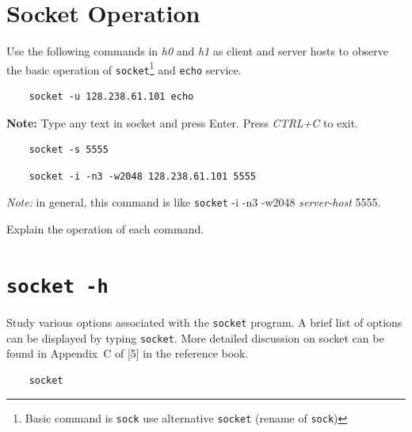\documentclass{UTNetLab}
\begin{document}
\section{Socket Operation}
    Use the following commands in \textit{h0} and \textit{h1} as client and server hosts to observe the basic operation of \lstinline{socket}\footnote{Basic command is \lstinline{sock} use alternative \lstinline{socket} (rename of \lstinline{sock})} and \lstinline{echo} service.
    
    \begin{lstlisting}
    socket -u 128.238.61.101 echo
    \end{lstlisting}
    
   \textbf{Note:} Type any text in socket and press Enter. Press \textit{CTRL+C} to exit.
   
   
    
    \begin{lstlisting}
   	socket -s 5555 
    \end{lstlisting}
    
    \begin{lstlisting}    	
    socket -i -n3 -w2048 128.238.61.101 5555
    \end{lstlisting}
    
    \textit{Note: }in general, this command is like \lstinline{socket} -i -n3 -w2048 \textit{server-host} 5555. 
     
    \begin{report}
    \item Explain the operation of each command.
    \end{report}

\section{\texttt{socket -h}}
    Study various options associated with the \lstinline{socket} program.
    A brief list of options can be displayed by typing \lstinline{socket}. More detailed discussion on socket can be found in Appendix~C of [5] in the reference book.
    
    \begin{lstlisting}
    socket
    \end{lstlisting}
\end{document}
